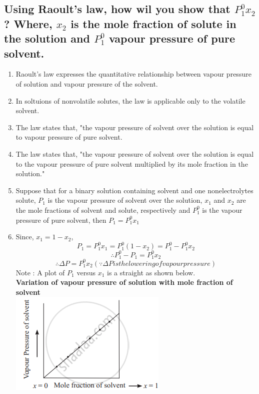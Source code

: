 \documentclass{article}
\begin{document}
   \subsection{Using Raoult's law, how wil you show that $P_1^0x_2$
   ? Where, $x_2$ is the mole fraction of solute in the solution and
   $P_1^0$ vapour pressure of pure solvent.}
   \begin{enumerate}
	\item Raoult's law expresses the quantitative relationship
	between vapour pressure of solution and vapour pressure of
	the solvent.
	\item In soltuions of nonvolatile solutes, the law is
	applicable only to the volatile solvent.
	\item The law states that, "the vapour pressure of solvent
	over the solution is equal to vapour pressure of pure solvent.
	\item The law states that, "the vapour pressure of solvent
	over the solution is equal to the vapour pressure of pure
	solvent multiplied by its mole fraction in the solution."
	\item Suppose that for a binary solution containing solvent
	and one nonelectrolytes solute, $P_1$ is the vapour pressure
	of solvent over the solution, $x_1$ and $x_2$ are the mole
	fractions of solvent and solute, respectively and $P_1^0$
	is the vapour pressure of pure solvent, then $P_1 = P_1^0x_1$
	\item Since, $x_1 = 1 - x_2$,
	\begin{equation} P_1 = P_1^0x_1 = P_1^0(1-x_2) = 
	P_1^0 - P_1^0x_2 \end{equation}
	\begin{equation}\therefore P_1^0 - P_1 = P_1^0x_2
	\end {equation}
	\begin{equation} \therefore \Delta P = P_1^0x_2 
	(\because \Delta P is the lowering of vapour pressure)
	\end{equation}
	Note : A plot of $P_1$ versus $x_1$ is a straight as shown
	below.\\
	\textbf{Variation of vapour pressure of solution with mole
	fraction of solvent}\\
	\includegraphics[scale=0.5]{vapour}
   \end{enumerate}
\end{document}
